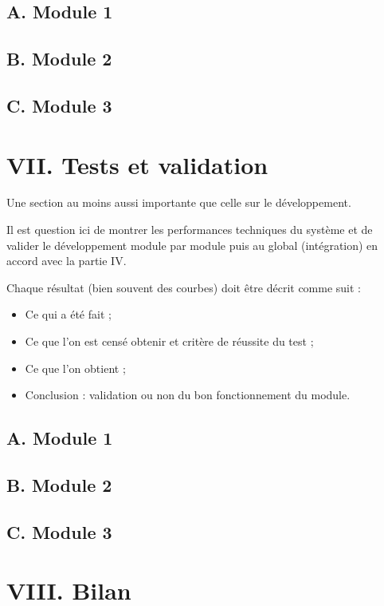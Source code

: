 \documentclass[a4paper,11pt]{book}
\begin{document}
\subsection*{A. Module 1}
\subsection*{B. Module 2}
\subsection*{C. Module 3}


\newpage
\section*{VII. Tests et validation}
Une section au moins aussi importante que celle sur le développement.

\vspace{2mm}
\noindent Il est question ici de montrer les performances techniques du système et de valider le développement module par module puis au global (intégration) en accord avec la partie IV.

\vspace{2mm}
\noindent Chaque résultat (bien souvent des courbes) doit être décrit comme suit : 
\begin{itemize}
	\item Ce qui a été fait ;
	\item Ce que l’on est censé obtenir et critère de réussite du test ;
	\item Ce que l’on obtient ;
	\item Conclusion : validation ou non du bon fonctionnement du module.
\end{itemize}

\subsection*{A. Module 1}
\subsection*{B. Module 2}
\subsection*{C. Module 3}

\newpage
\section*{VIII. Bilan}
\end{document}
